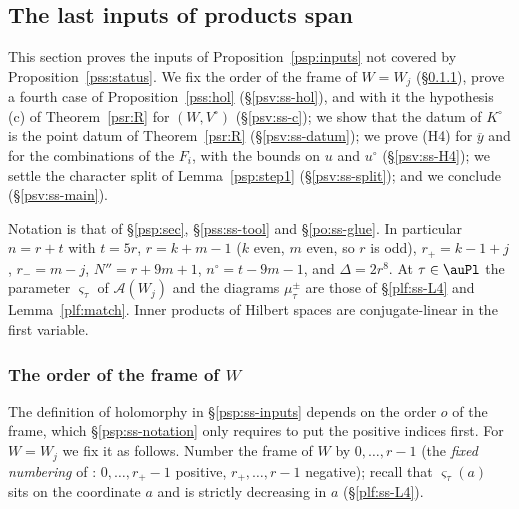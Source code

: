 \documentclass[10pt]{amsart}
\theoremstyle{definition}
\theoremstyle{remark}
\begin{document}
\providecommand{\auU}{\mathrm U}
\providecommand{\auGL}{\mathrm{GL}}
\providecommand{\auHom}{\operatorname{Hom}}
\providecommand{\auA}{\mathbb A}
\providecommand{\aubar}[1]{\overline{#1}}
\providecommand{\poA}{\mathcal A}
\providecommand{\pspG}{G_\infty}
\providecommand{\pspm}{\mathsf m}
\providecommand{\pspn}{n_*}
\providecommand{\pcMat}{\mathrm M}
\providecommand{\pop}{\mathsf p}
\providecommand{\pssg}{\mathfrak g}
\providecommand{\psvmu}{\mu}
\providecommand{\pcm}{\mathfrak m}
\providecommand{\auO}{\mathcal O}

\subsection{The last inputs of products span}\label{psv:sec}

This section proves the inputs of Proposition~\ref{psp:inputs} not covered by
Proposition~\ref{pss:status}. We fix the order of the frame of
$W=W_j$ (\S\ref{psv:ss-order}), prove a fourth case of Proposition~\ref{pss:hol}
(\S\ref{psv:ss-hol}), and with it the hypothesis (c) of Theorem~\ref{psr:R} for $(W,V^\circ)$
(\S\ref{psv:ss-c}); we show that the datum of $K^\circ$ is the point datum of Theorem~\ref{psr:R}
(\S\ref{psv:ss-datum}); we prove (H4) for $\aubar y$ and for the combinations of the $F_i$, with the
bounds on $u$ and $u^\circ$ (\S\ref{psv:ss-H4}); we settle the character split of
Lemma~\ref{psp:step1} (\S\ref{psv:ss-split}); and we conclude (\S\ref{psv:ss-main}).

Notation is that of \S\ref{psp:sec}, \S\ref{pss:ss-tool} and \S\ref{po:ss-glue}. In particular
$n=r+t$ with $t=5r$, $r=k+m-1$ ($k$ even, $m$ even, so $r$ is odd), $r_+=k-1+j$, $r_-=m-j$,
$N''=r+9m+1$, $n^\circ=t-9m-1$, and $\Delta=2r^8$. At $\tau\in\auPl$ the parameter $\varsigma_\tau$ of
$\poA(W_j)$ and the diagrams $\mu^\pm_\tau$ are those of \S\ref{plf:ss-L4} and
Lemma~\ref{plf:match}. Inner products of Hilbert spaces are conjugate-linear in the first
variable.

\subsubsection{The order of the frame of $W$}\label{psv:ss-order}

The definition of holomorphy in \S\ref{psp:ss-inputs} depends on the order $o$ of the frame, which
\S\ref{psp:ss-notation} only requires to put the positive indices first. For $W=W_j$ we fix it as
follows. Number the frame of $W$ by $0,\dots,r-1$ (the \emph{fixed numbering} of
{\cite[\S14.3]{P46}}: $0,\dots,r_+-1$ positive, $r_+,\dots,r-1$ negative); recall that $\varsigma_\tau(a)$
sits on the coordinate $a$ and is strictly decreasing in $a$ (\S\ref{plf:ss-L4}).
\end{document}
